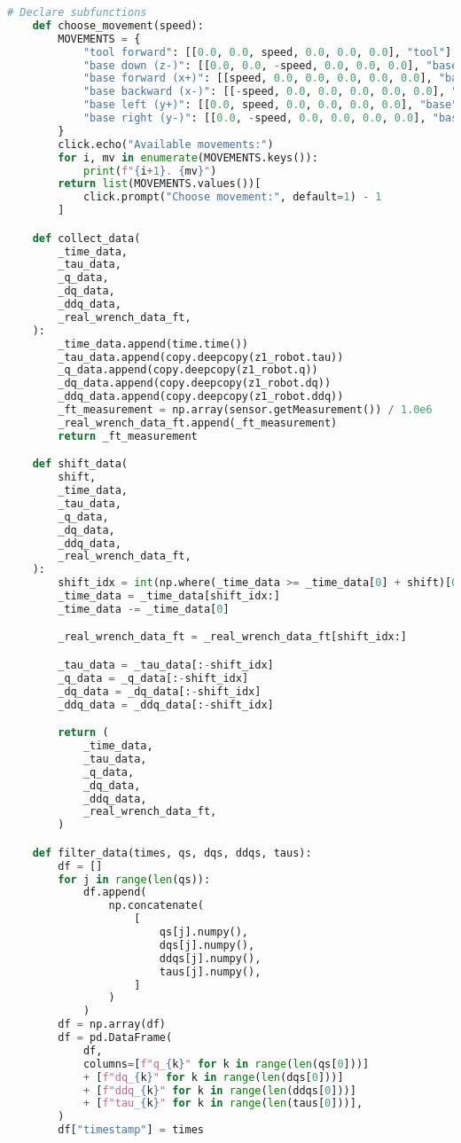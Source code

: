 \begin{lstlisting}[language=python, caption=\raggedright{verification/fs\_verification.py}, frame=single]
    # Declare subfunctions
    def choose_movement(speed):
        MOVEMENTS = {
            "tool forward": [[0.0, 0.0, speed, 0.0, 0.0, 0.0], "tool"],
            "base down (z-)": [[0.0, 0.0, -speed, 0.0, 0.0, 0.0], "base"],
            "base forward (x+)": [[speed, 0.0, 0.0, 0.0, 0.0, 0.0], "base"],
            "base backward (x-)": [[-speed, 0.0, 0.0, 0.0, 0.0, 0.0], "base"],
            "base left (y+)": [[0.0, speed, 0.0, 0.0, 0.0, 0.0], "base"],
            "base right (y-)": [[0.0, -speed, 0.0, 0.0, 0.0, 0.0], "base"],
        }
        click.echo("Available movements:")
        for i, mv in enumerate(MOVEMENTS.keys()):
            print(f"{i+1}. {mv}")
        return list(MOVEMENTS.values())[
            click.prompt("Choose movement:", default=1) - 1
        ]

    def collect_data(
        _time_data,
        _tau_data,
        _q_data,
        _dq_data,
        _ddq_data,
        _real_wrench_data_ft,
    ):
        _time_data.append(time.time())
        _tau_data.append(copy.deepcopy(z1_robot.tau))
        _q_data.append(copy.deepcopy(z1_robot.q))
        _dq_data.append(copy.deepcopy(z1_robot.dq))
        _ddq_data.append(copy.deepcopy(z1_robot.ddq))
        _ft_measurement = np.array(sensor.getMeasurement()) / 1.0e6
        _real_wrench_data_ft.append(_ft_measurement)
        return _ft_measurement

    def shift_data(
        shift,
        _time_data,
        _tau_data,
        _q_data,
        _dq_data,
        _ddq_data,
        _real_wrench_data_ft,
    ):
        shift_idx = int(np.where(_time_data >= _time_data[0] + shift)[0][0])
        _time_data = _time_data[shift_idx:]
        _time_data -= _time_data[0]

        _real_wrench_data_ft = _real_wrench_data_ft[shift_idx:]

        _tau_data = _tau_data[:-shift_idx]
        _q_data = _q_data[:-shift_idx]
        _dq_data = _dq_data[:-shift_idx]
        _ddq_data = _ddq_data[:-shift_idx]

        return (
            _time_data,
            _tau_data,
            _q_data,
            _dq_data,
            _ddq_data,
            _real_wrench_data_ft,
        )

    def filter_data(times, qs, dqs, ddqs, taus):
        df = []
        for j in range(len(qs)):
            df.append(
                np.concatenate(
                    [
                        qs[j].numpy(),
                        dqs[j].numpy(),
                        ddqs[j].numpy(),
                        taus[j].numpy(),
                    ]
                )
            )
        df = np.array(df)
        df = pd.DataFrame(
            df,
            columns=[f"q_{k}" for k in range(len(qs[0]))]
            + [f"dq_{k}" for k in range(len(dqs[0]))]
            + [f"ddq_{k}" for k in range(len(ddqs[0]))]
            + [f"tau_{k}" for k in range(len(taus[0]))],
        )
        df["timestamp"] = times


\end{lstlisting}
